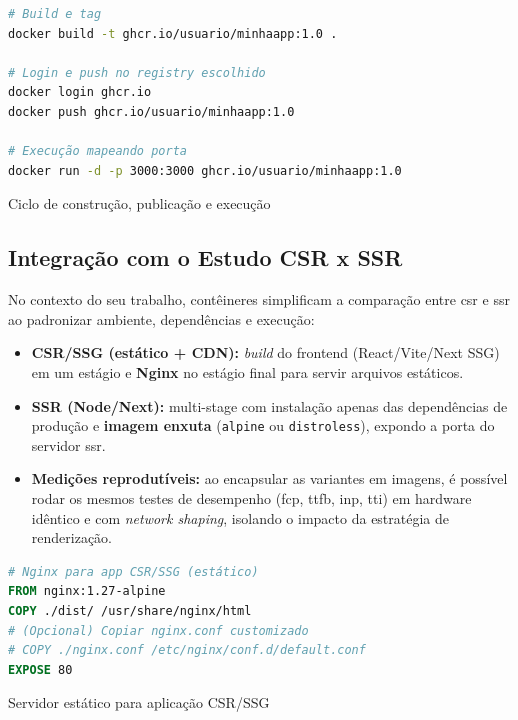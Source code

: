 \begin{codigo}[H]
\begin{lstlisting}[language=bash]
# Build e tag
docker build -t ghcr.io/usuario/minhaapp:1.0 .

# Login e push no registry escolhido
docker login ghcr.io
docker push ghcr.io/usuario/minhaapp:1.0

# Execução mapeando porta
docker run -d -p 3000:3000 ghcr.io/usuario/minhaapp:1.0
\end{lstlisting}
\caption{Ciclo de construção, publicação e execução}
\label{lst:docker-workflow}
\end{codigo}

\subsection{Integração com o Estudo CSR x SSR}
\label{sec:docker-csr-ssr}

No contexto do seu trabalho, contêineres simplificam a comparação entre \acrshort{csr} e \acrshort{ssr} ao padronizar ambiente, dependências e execução:

\begin{itemize}
  \item \textbf{CSR/SSG (estático + CDN):} \textit{build} do frontend (React/Vite/Next SSG) em um estágio e \textbf{Nginx} no estágio final para servir arquivos estáticos.  
  \item \textbf{SSR (Node/Next):} multi-stage com instalação apenas das dependências de produção e \textbf{imagem enxuta} (\texttt{alpine} ou \texttt{distroless}), expondo a porta do servidor \acrshort{ssr}.
  \item \textbf{Medições reprodutíveis:} ao encapsular as variantes em imagens, é possível rodar os mesmos testes de desempenho (\acrshort{fcp}, \acrshort{ttfb}, \acrshort{inp}, \acrshort{tti}) em hardware idêntico e com \textit{network shaping}, isolando o impacto da estratégia de renderização.
\end{itemize}

\begin{codigo}[H]
\begin{lstlisting}[language=Dockerfile]
# Nginx para app CSR/SSG (estático)
FROM nginx:1.27-alpine
COPY ./dist/ /usr/share/nginx/html
# (Opcional) Copiar nginx.conf customizado
# COPY ./nginx.conf /etc/nginx/conf.d/default.conf
EXPOSE 80
\end{lstlisting}
\caption{Servidor estático para aplicação CSR/SSG}
\label{lst:dockerfile-nginx-static}
\end{codigo}

